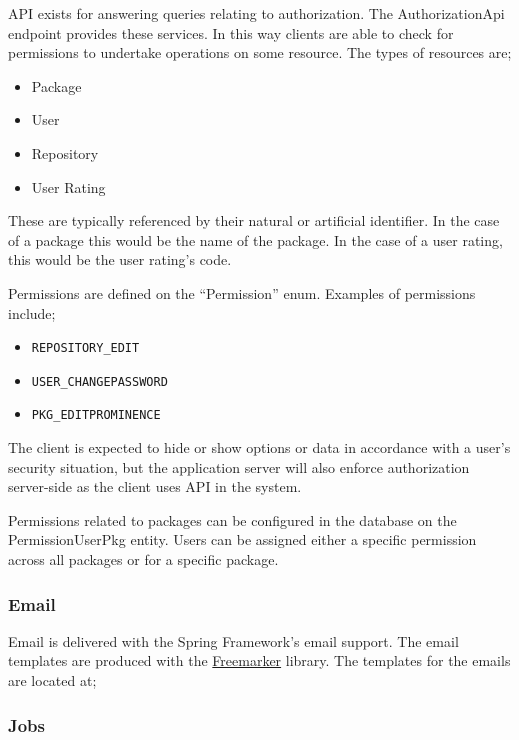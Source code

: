 API exists for answering queries relating to authorization.  The AuthorizationApi endpoint provides these services.  In this way clients are able to check for permissions to undertake operations on some resource.  The types of resources are;

\begin{itemize}
\item Package
\item User
\item Repository
\item User Rating
\end{itemize}

These are typically referenced by their natural or artificial identifier.  In the case of a package this would be the name of the package.  In the case of a user rating, this would be the user rating's code.

Permissions are defined on the ``Permission'' enum.  Examples of permissions include;

\begin{itemize}
\item {\tt REPOSITORY\_EDIT}
\item {\tt USER\_CHANGEPASSWORD}
\item {\tt PKG\_EDITPROMINENCE}
\end{itemize}

The client is expected to hide or show options or data in accordance with a user's security situation, but the application server will also enforce authorization server-side as the client uses API in the system.

Permissions related to packages can be configured in the database on the PermissionUserPkg entity.  Users can be assigned either a specific permission across all packages or for a specific package.

\subsubsection{Email}

Email is delivered with the Spring Framework's email support.  The email templates are produced with the \href{http://freemarker.org/}{Freemarker} library.  The templates for the emails are located at;


\subsubsection{Jobs}

